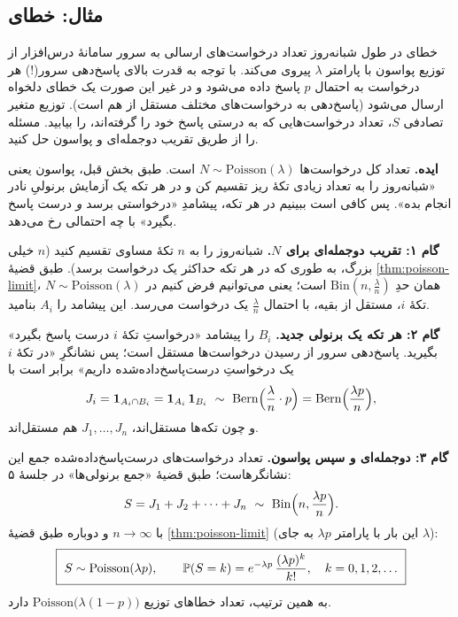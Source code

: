\subsection{مثال: خطای }

\begin{example}[label=ex:5xx]{خطای }
در طول شبانه‌روز تعداد درخواست‌های ارسالی به سرور سامانهٔ درس‌افزار از توزیع پواسون با پارامتر $\lambda$ پیروی می‌کند. با توجه به قدرت بالای پاسخ‌دهی سرور(!) هر درخواست به احتمال $p$ پاسخ داده می‌شود و در غیر این صورت یک خطای دلخواه  ارسال می‌شود (پاسخ‌دهی به درخواست‌های مختلف مستقل از هم است). توزیع متغیر تصادفی $S$، تعداد درخواست‌هایی که به درستی پاسخ خود را گرفته‌اند، را بیابید. مسئله را از طریق تقریب دوجمله‌ای و پواسون حل کنید.
\begin{solution}
\textbf{ایده.} تعداد کل درخواست‌ها $N\sim\mathrm{Poisson}(\lambda)$ است. طبق بخش قبل، پواسون یعنی «شبانه‌روز را به تعداد زیادی تکهٔ ریز تقسیم کن و در هر تکه یک آزمایش برنولیِ نادر انجام بده». پس کافی است ببینیم در هر تکه، پیشامدِ «درخواستی برسد \emph{و} درست پاسخ بگیرد» با چه احتمالی رخ می‌دهد.

\textbf{گام ۱: تقریب دوجمله‌ای برای $N$.} شبانه‌روز را به $n$ تکهٔ مساوی تقسیم کنید ($n$ خیلی بزرگ، به طوری که در هر تکه حداکثر یک درخواست برسد). طبق قضیهٔ \ref{thm:poisson-limit}، $N\sim\mathrm{Poisson}(\lambda)$ همان حدِ $\mathrm{Bin}(n,\frac\lambda n)$ است؛ یعنی می‌توانیم فرض کنیم در تکهٔ $i$، مستقل از بقیه، با احتمال $\frac\lambda n$ یک درخواست می‌رسد. این پیشامد را $A_i$ بنامید.

\textbf{گام ۲: هر تکه یک برنولی جدید.} $B_i$ را پیشامد «درخواستِ تکهٔ $i$ درست پاسخ بگیرد» بگیرید. پاسخ‌دهی سرور از رسیدن درخواست‌ها مستقل است؛ پس نشانگرِ «در تکهٔ $i$ یک درخواستِ درست‌پاسخ‌داده‌شده داریم» برابر است با
\[ J_i=\ind_{A_i\cap B_i}=\ind_{A_i}\,\ind_{B_i}\ \sim\ \mathrm{Bern}\Bigl(\frac{\lambda}{n}\cdot p\Bigr)=\mathrm{Bern}\Bigl(\frac{\lambda p}{n}\Bigr), \]
و چون تکه‌ها مستقل‌اند، $J_1,\dots,J_n$ هم مستقل‌اند.

\textbf{گام ۳: دوجمله‌ای و سپس پواسون.} تعداد درخواست‌های درست‌پاسخ‌داده‌شده جمع این نشانگرهاست؛ طبق قضیهٔ «جمع برنولی‌ها» در جلسهٔ ۵:
\[ S=J_1+J_2+\cdots+J_n\ \sim\ \mathrm{Bin}\Bigl(n,\frac{\lambda p}{n}\Bigr). \]
با $n\to\infty$ و دوباره طبق قضیهٔ \ref{thm:poisson-limit} (این بار با پارامتر $\lambda p$ به جای $\lambda$):
\[ \boxed{\ S\sim\mathrm{Poisson}(\lambda p),\qquad \P(S=k)=e^{-\lambda p}\,\frac{(\lambda p)^k}{k!},\quad k=0,1,2,\dots\ } \]
به همین ترتیب، تعداد خطاهای  توزیع $\mathrm{Poisson}\bigl(\lambda(1-p)\bigr)$ دارد.
\medskip


\end{solution}
\end{example}
